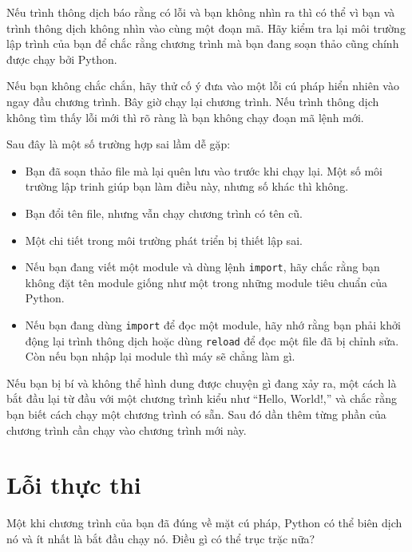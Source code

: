 \documentclass[11pt]{book}
\begin{document}
Nếu trình thông dịch báo rằng có lỗi và bạn không nhìn ra thì có thể 
vì bạn và trình thông dịch không nhìn vào cùng một đoạn mã. Hãy
kiểm tra lại môi trường lập trình của bạn để chắc rằng chương trình
mà bạn đang soạn thảo cũng chính được chạy bởi Python.

Nếu bạn không chắc chắn, hãy thử cố ý đưa vào một lỗi cú pháp hiển nhiên
vào ngay đầu chương trình. Bây giờ chạy lại chương trình. Nếu trình
thông dịch không tìm thấy lỗi mới thì rõ ràng là bạn không chạy 
đoạn mã lệnh mới.

Sau đây là một số trường hợp sai lầm dễ gặp:

\begin{itemize}

\item Bạn đã soạn thảo file mà lại quên lưu vào trước khi
chạy lại. Một số môi trường lập trinh giúp bạn làm điều này,
nhưng số khác thì không.

\item Bạn đổi tên file, nhưng vẫn chạy chương trình có tên cũ.

\item Một chi tiết trong môi trường phát triển bị thiết lập sai.

\item Nếu bạn đang viết một module và dùng lệnh {\tt import},
hãy chắc rằng bạn không đặt tên module giống như một trong những
module tiêu chuẩn của Python.


\item Nếu bạn đang dùng {\tt import} để đọc một module, hãy nhớ rằng
bạn phải khởi động lại trình thông dịch hoặc dùng {\tt reload}
để đọc một file đã bị chỉnh sửa. Còn nếu bạn nhập lại module thì 
máy sẽ chẳng làm gì.

\end{itemize}

Nếu bạn bị bí và không thể hình dung được chuyện gì đang xảy ra, 
một cách là bắt đầu lại từ đầu với một chương trình kiểu như ``Hello, World!,''
và chắc rằng bạn biết cách chạy một chương trình có sẵn. Sau đó 
dần thêm từng phần của chương trình cần chạy vào chương trình mới này.


\section{Lỗi thực thi}

Một khi chương trình của bạn đã đúng về mặt cú pháp,
Python có thể biên dịch nó và ít nhất là bắt đầu chạy nó.
Điều gì có thể trục trặc nữa?
\end{document}
